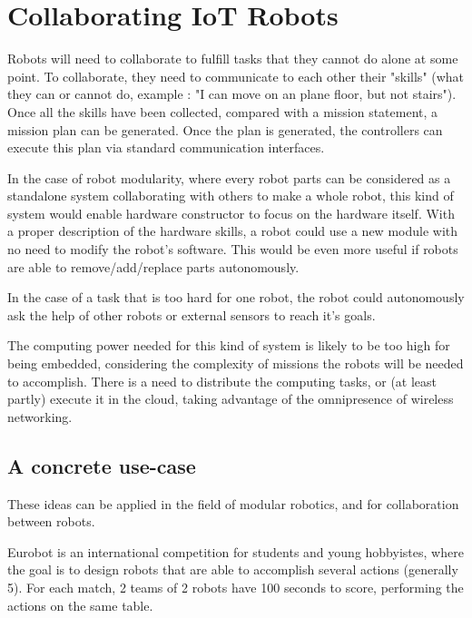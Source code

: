\section{Collaborating IoT Robots}

Robots will need to collaborate to fulfill tasks that they cannot do alone at some point.
To collaborate, they need to communicate to each other their "skills" (what they can or cannot do, example : "I can move on an plane floor, but not stairs").
Once all the skills have been collected, compared with a mission statement, a mission plan can be generated.
Once the plan is generated, the controllers can execute this plan via standard communication interfaces.

In the case of robot modularity, where every robot parts can be considered as a standalone system collaborating with others to make a whole robot, this kind of system would enable hardware constructor to focus on the hardware itself.
With a proper description of the hardware skills, a robot could use a new module with no need to modify the robot's software.
This would be even more useful if robots are able to remove/add/replace parts autonomously.

In the case of a task that is too hard for one robot, the robot could autonomously ask the help of other robots or external sensors to reach it's goals.

The computing power needed for this kind of system is likely to be too high for being embedded, considering the complexity of missions the robots will be needed to accomplish.
There is a need to distribute the computing tasks, or (at least partly) execute it in the cloud, taking advantage of the omnipresence of wireless networking.

\subsection{A concrete use-case}


These ideas can be applied in the field of modular robotics, and for collaboration between robots.

Eurobot is an international competition for students and young hobbyistes, where the goal is to design robots that are able to accomplish several actions (generally 5).
For each match, 2 teams of 2 robots have 100 seconds to score, performing the actions on the same table.

